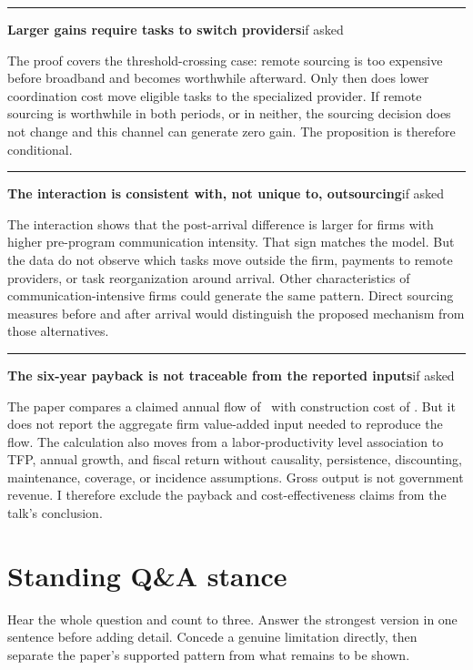 \documentclass[11pt]{article}
\newcommand{\scriptframe}[3]{%
  \Needspace{11\baselineskip}%
  \par\medskip\noindent\textcolor{ScriptBlue}{\rule{\linewidth}{0.55pt}}%
  \par\smallskip\noindent
  \textbf{#1}\hfill\textcolor{ScriptGray}{\small #2}\par\smallskip
  #3\par}
\begin{document}
\scriptframe{Larger gains require tasks to switch providers}{if asked}{%
  The proof covers the threshold-crossing case: remote sourcing is too expensive
  before broadband and becomes worthwhile afterward. Only then does lower
  coordination cost move eligible tasks to the specialized provider. If remote
  sourcing is worthwhile in both periods, or in neither, the sourcing decision
  does not change and this channel can generate zero gain. The proposition is
  therefore conditional.
}

\scriptframe{The interaction is consistent with, not unique to, outsourcing}{if asked}{%
  The interaction shows that the post-arrival difference is larger for firms
  with higher pre-program communication intensity. That sign matches the model.
  But the data do not observe which tasks move outside the firm, payments to
  remote providers, or task reorganization around arrival. Other characteristics
  of communication-intensive firms could generate the same pattern. Direct
  sourcing measures before and after arrival would distinguish the proposed
  mechanism from those alternatives.
}

\scriptframe{The six-year payback is not traceable from the reported inputs}{if asked}{%
  The paper compares a claimed annual flow of \ResPolicyValue\ with construction
  cost of \ResPolicyCost. But it does not report the aggregate firm value-added
  input needed to reproduce the flow. The calculation also moves from a
  labor-productivity level association to TFP, annual growth, and fiscal return
  without causality, persistence, discounting, maintenance, coverage, or
  incidence assumptions. Gross output is not government revenue. I therefore
  exclude the payback and cost-effectiveness claims from the talk's conclusion.
}

\section*{Standing Q\&A stance}
Hear the whole question and count to three. Answer the strongest version in
one sentence before adding detail. Concede a genuine limitation directly,
then separate the paper's supported pattern from what remains to be shown.
\end{document}
